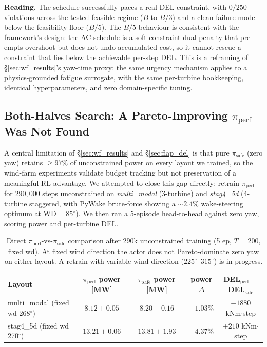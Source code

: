 \textbf{Reading.}
The schedule successfully paces a real DEL constraint, with $0/250$ violations across the tested feasible regime ($B$ to $B/3$) and a clean failure mode below the feasibility floor ($B/5$).
The $B/5$ behaviour is consistent with the framework's design: the AC schedule is a soft-constraint dual penalty that pre-empts overshoot but does not undo accumulated cost, so it cannot rescue a constraint that lies below the achievable per-step DEL.
This is a reframing of \S\ref{sec:wf_results}'s yaw-time proxy: the same urgency mechanism applies to a physics-grounded fatigue surrogate, with the same per-turbine bookkeeping, identical hyperparameters, and zero domain-specific tuning.

\subsection{Both-Halves Search: A Pareto-Improving \texorpdfstring{$\pi_{\mathrm{perf}}$}{pi\_perf} Was Not Found}
\label{sec:both_halves}

A central limitation of \S\ref{sec:wf_results} and \S\ref{sec:flap_del} is that pure $\pi_{\mathrm{safe}}$ (zero yaw) retains $\ge\!97\%$ of unconstrained power on every layout we trained, so the wind-farm experiments validate budget tracking but not preservation of a meaningful RL advantage.
We attempted to close this gap directly: retrain $\pi_{\mathrm{perf}}$ for $290{,}000$ steps unconstrained on \emph{multi\_modal} (3-turbine) and \emph{stag4\_5d} (4-turbine staggered, with PyWake brute-force showing a $\sim\!2.4\%$ wake-steering optimum at WD$=85^\circ$).
We then ran a 5-episode head-to-head against zero yaw, scoring power and per-turbine DEL.

\begin{table}[h]
\centering
\caption{Direct $\pi_{\mathrm{perf}}$-vs-$\pi_{\mathrm{safe}}$ comparison after $290$k unconstrained training (5 ep, $T\!=\!200$, fixed wd). At fixed wind direction the actor does not Pareto-dominate zero yaw on either layout. A retrain with variable wind direction ($225^\circ$--$315^\circ$) is in progress.}
\label{tab:both_halves}
\begin{tabular}{lcccc}
\toprule
Layout & $\pi_{\mathrm{perf}}$ power [MW] & $\pi_{\mathrm{safe}}$ power [MW] & power $\Delta$ & DEL$_{\mathrm{perf}}-$DEL$_{\mathrm{safe}}$ \\
\midrule
multi\_modal (fixed wd 268$^\circ$) & $8.12\!\pm\!0.05$ & $8.20\!\pm\!0.16$ & $-1.03\%$ & $-1880$ kNm$\cdot$step \\
stag4\_5d (fixed wd 270$^\circ$)    & $13.21\!\pm\!0.06$ & $13.81\!\pm\!1.93$ & $-4.37\%$ & $+210$ kNm$\cdot$step \\
\bottomrule
\end{tabular}
\end{table}

